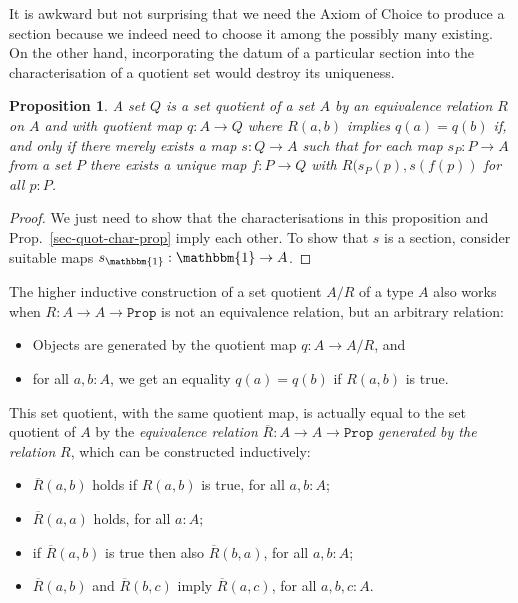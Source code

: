 \documentclass{amsart}
\theoremstyle{plain}
\numberwithin{equation}{section} %
\numberwithin{figure}{section} %
\theoremstyle{plain}
\theoremstyle{plain}
\theoremstyle{plain}
\theoremstyle{plain}
\theoremstyle{plain}
\newtheorem{prop}[thm]{Proposition} %
\theoremstyle{plain}
\theoremstyle{remark}
\theoremstyle{remark}
\theoremstyle{remark}
\begin{document}
It is awkward but not surprising that we need the Axiom of Choice to produce a section because we indeed need to choose it among the possibly many existing. On the other hand, incorporating the datum of a particular section into the characterisation of a quotient set would destroy its uniqueness.

\begin{prop}  %
A set $Q$ is a set quotient of a set $A$ by an equivalence relation $R$ on $A$ and with quotient map $q : A \rightarrow Q$ where $R(a, b)$ implies $q(a) = q(b)$ if, and only if there merely exists a map $s : Q \rightarrow A$ such that for each map $s_P : P \rightarrow A$ from a set $P$ there exists a unique map $f : P \rightarrow Q$ with 
$R(s_P(p), s(f(p))$ for all $p : P$.
\end{prop}
\begin{proof}
We just need to show that the characterisations in this proposition and Prop.~\ref{sec-quot-char-prop} imply each other. To show that $s$ is a section, consider suitable maps $s_\mathbbm{1} : \mathbbm{1} \rightarrow A$.  
\end{proof}

The higher inductive construction of a set quotient $A/R$ of a type $A$ also works when $R : A \rightarrow A \rightarrow \mathtt{Prop}$ is not an equivalence relation, but an arbitrary relation:
\begin{itemize}
\item Objects are generated by the quotient map $q : A \rightarrow A/R$, and
\item for all $a, b : A$, we get an equality $q(a) = q(b)$ if $R(a, b)$ is true.
\end{itemize}

This set quotient, with the same quotient map, is actually equal to the set quotient of $A$ by the \textit{equivalence relation} $\overline{R} : A \rightarrow A \rightarrow \mathtt{Prop}$ \textit{generated by the relation} $R$, which can be constructed inductively:
\begin{itemize}
\item $\overline{R}(a, b)$ holds if $R(a, b)$ is true, for all $a, b : A$;
\item $\overline{R}(a, a)$ holds, for all $a : A$;
\item if $\overline{R}(a, b)$ is true then also $\overline{R}(b, a)$, for all $a, b : A$; 
\item $\overline{R}(a, b)$ and $\overline{R}(b, c)$ imply $\overline{R}(a, c)$, for all $a, b, c : A$.
\end{itemize}
\end{document}
